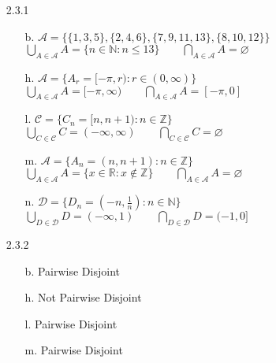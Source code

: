 \documentclass[11pt]{amsart}
\theoremstyle{definition}
\begin{document}
\begin{itemize}
\begin{itemize}
\end{itemize}

\item[2.3.1]
\begin{itemize}
    \item[b.] $\mathscr{A}=\{\{1,3,5\},\{2,4,6\},\{7,9,11,13\},\{8,10,12\}\}$ \\
              $\displaystyle
              \bigcup_{A\in\mathscr{A}}A=\{n\in\mathbb{N}:n\le 13\}
              \qquad
              \bigcap_{A\in\mathscr{A}}A=\varnothing$

    \item[h.] $\mathscr{A}=\{A_r=[-\pi,r):r\in(0,\infty)\}$ \\
              $\displaystyle
              \bigcup_{A\in\mathscr{A}}A=[-\pi,\infty)
              \qquad
              \bigcap_{A\in\mathscr{A}}A=[-\pi,0]$

    \item[l.] $\mathscr{C}=\{C_n=[n,n+1):n\in\mathbb{Z}\}$ \\
              $\displaystyle
              \bigcup_{C\in\mathscr{C}}C=(-\infty,\infty)
              \qquad
              \bigcap_{C\in\mathscr{C}}C=\varnothing$

    \item[m.] $\mathscr{A}=\{A_n=(n,n+1):n\in\mathbb{Z}\}$ \\
              $\displaystyle
              \bigcup_{A\in\mathscr{A}}A=\{x\in\mathbb{R}:x\notin\mathbb{Z}\}
              \qquad
              \bigcap_{A\in\mathscr{A}}A=\varnothing$

    \item[n.] $\mathscr{D}=\{D_n=(-n,\frac 1n):n\in\mathbb{N}\}$ \\
              $\displaystyle
              \bigcup_{D\in\mathscr{D}}D=(-\infty,1)
              \qquad
              \bigcap_{D\in\mathscr{D}}D=(-1,0]$
    
\end{itemize}

\item[2.3.2]
\begin{itemize}
    \item[b.] Pairwise Disjoint

    \item[h.] Not Pairwise Disjoint

    \item[l.] Pairwise Disjoint

    \item[m.] Pairwise Disjoint


\end{itemize}
\end{itemize}
\end{document}
